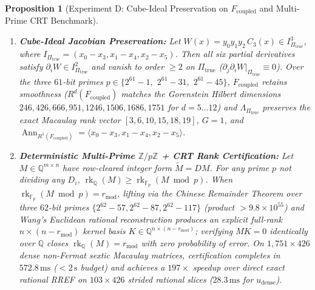 \documentclass[11pt,a4paper]{amsart}
\newtheorem{proposition}[theorem]{Proposition}
\theoremstyle{definition}
\theoremstyle{remark}
\DeclareMathOperator{\rk}{rk}
\DeclareMathOperator{\Ann}{Ann}
\begin{document}
\begin{proposition}[Experiment D: Cube-Ideal Preservation on $F_{\mathrm{coupled}}$ and Multi-Prime CRT Benchmark]
\label{thm:D}
\leavevmode
\begin{enumerate}[label=(\roman*)]
\item \textbf{Cube-Ideal Jacobian Preservation:} Let $W(x) = y_0 y_1 y_2\, C_3(x) \in I_{\Pi_{\mathrm{true}}}^3$, where $I_{\Pi_{\mathrm{true}}} = (x_0-x_3, x_1-x_4, x_2-x_5)$. Then all six partial derivatives satisfy $\partial_i W \in I_{\Pi_{\mathrm{true}}}^2$ and vanish to order $\ge 2$ on $\Pi_{\mathrm{true}}$ ($\partial_j \partial_i W|_{\Pi_{\mathrm{true}}} \equiv 0$). Over the three $61$-bit primes $p \in \{2^{61}-1,$ $2^{61}-31,$ $2^{61}-45\}$, $F_{\mathrm{coupled}}$ retains smoothness ($R^d(F_{\mathrm{coupled}})$ matches the Gorenstein Hilbert dimensions $246, 426, 666, 951, 1246, 1506, 1686, 1751$ for $d = 5 \dots 12$) and $\Lambda_{\Pi_{\mathrm{true}}}$ preserves the exact Macaulay rank vector $[3,6,10,15,18,19]$, $G=1$, and $\Ann_{R^1(F_{\mathrm{coupled}})} = \langle x_0-x_3, x_1-x_4, x_2-x_5 \rangle$.
\item \textbf{Deterministic Multi-Prime $\mathbb{Z}/p\mathbb{Z}$ + CRT Rank Certification:} Let $M \in \mathbb{Q}^{m \times n}$ have row-cleared integer form $\widetilde{M} = D M$. For any prime $p$ not dividing any $D_i$, $\rk_{\mathbb{Q}}(M) \ge \rk_{\mathbb{F}_p}(M \bmod p)$. When $\rk_{\mathbb{F}_p}(M \bmod p) = r_{\mathrm{mod}}$, lifting via the Chinese Remainder Theorem over three $62$-bit primes $\{2^{62}-57, 2^{62}-87, 2^{62}-117\}$ (product $> 9.8 \times 10^{55}$) and Wang's Euclidean rational reconstruction \cite{Wang1981} produces an explicit full-rank $n \times (n - r_{\mathrm{mod}})$ kernel basis $K \in \mathbb{Q}^{n \times (n - r_{\mathrm{mod}})}$; verifying $M K = 0$ identically over $\mathbb{Q}$ closes $\rk_{\mathbb{Q}}(M) = r_{\mathrm{mod}}$ with zero probability of error. On $1,751 \times 426$ dense non-Fermat sextic Macaulay matrices, certification completes in $572.8\,\mathrm{ms}$ ($< 2\,\mathrm{s}$ budget) and achieves a $197\times$ speedup over direct exact rational RREF on $103 \times 426$ strided rational slices ($28.3\,\mathrm{ms}$ for $u_{\mathrm{dense}}$).
\end{enumerate}
\end{proposition}
\end{document}
